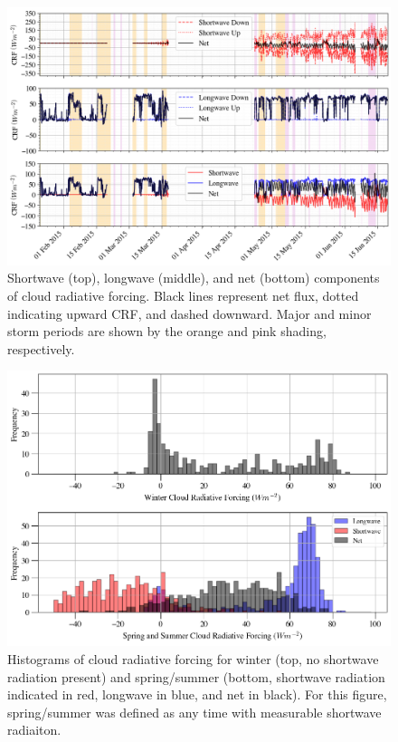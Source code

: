 \begin{figure}[h]
    \centering
    \includegraphics[width=1\linewidth]{figures/chapter4/RadForcing.png}
    \caption[Shortwave, longwave, and net components of cloud radiative forcing.]{Shortwave (top), longwave (middle), and net (bottom) components of cloud radiative forcing. Black lines represent net flux, dotted indicating upward CRF, and dashed downward. Major and minor storm periods are shown by the orange and pink shading, respectively.}
    \label{fig:crf_timeseries}
\end{figure}

\begin{figure}[h]
    \centering
    \includegraphics[width=1\linewidth]{figures/chapter4/ForcingValues.png}
    \caption[Histograms of cloud radiative forcing by season.]{Histograms of cloud radiative forcing for winter (top, no shortwave radiation present) and spring/summer (bottom, shortwave radiation indicated in red, longwave in blue, and net in black). For this figure, spring/summer was defined as any time with measurable shortwave radiaiton.}
    \label{fig:crf_histo}
\end{figure}

